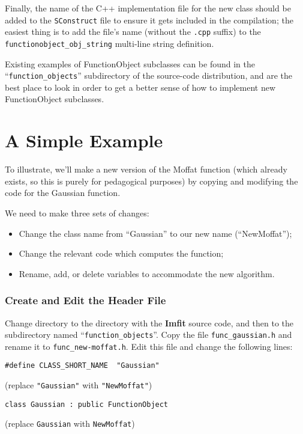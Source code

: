 \documentclass[10pt,a4paper,article]{memoir}
\newcommand{\imfit}{\textbf{Imfit}}
\begin{document}
Finally, the name of the C++ implementation file for the new class should be added
to the \texttt{SConstruct} file to ensure it gets included in the compilation; the
easiest thing is to add the file's name (without the \texttt{.cpp} suffix) to the
\texttt{functionobject\_obj\_string} multi-line string definition.

Existing examples of FunctionObject subclasses can be found in the ``\texttt{function\_objects}''
subdirectory of the source-code distribution, and are the best place to look in order
to get a better sense of how to implement new FunctionObject subclasses.


\section{A Simple Example}

To illustrate, we'll make a new version of the Moffat function (which already
exists, so this is purely for pedagogical purposes) by copying and modifying the
code for the Gaussian function.

\bigskip

We need to make three sets of changes:
\begin{itemize}
\item Change the class name from ``Gaussian'' to our new name (``NewMoffat'');
\item Change the relevant code which computes the function;
\item Rename, add, or delete variables to accommodate the new algorithm.
\end{itemize}


\subsubsection{Create and Edit the Header File}

Change directory to the directory with the \imfit{} source code, and then
to the subdirectory named ``\texttt{function\_objects}''. Copy the file
\texttt{func\_gaussian.h} and rename it to \texttt{func\_new-moffat.h}. Edit
this file and change the following lines:

\begin{verbatim}
#define CLASS_SHORT_NAME  "Gaussian"
\end{verbatim} 
(replace \texttt{"Gaussian"} with \texttt{"NewMoffat"})

\begin{verbatim}
class Gaussian : public FunctionObject
\end{verbatim}
(replace \texttt{Gaussian} with \texttt{NewMoffat})
\end{document}
